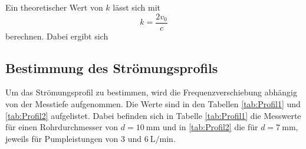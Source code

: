 Ein theoretischer Wert von $k$ lässt sich mit 
\begin{equation*}
  k=\frac{2 v_0}{c}
\end{equation*}
\noindent berechnen. 
Dabei ergibt sich 


\subsection{Bestimmung des Strömungsprofils}

Um das Strömungsprofil zu bestimmen, wird die Frequenzverschiebung abhängig von der Messtiefe aufgenommen.
Die Werte sind in den Tabellen \ref{tab:Profil1} und \ref{tab:Profil2} aufgelistet.
Dabei befinden sich in Tabelle \ref{tab:Profil1} die Messwerte für einen Rohrdurchmesser von $d=\qty{10}{\milli\meter}$ und in \ref{tab:Profil2} 
die für $d=\qty{7}{\milli\meter}$, jeweils für Pumpleistungen von $3$ und $\qty{6}{\liter\per\minute}$.

